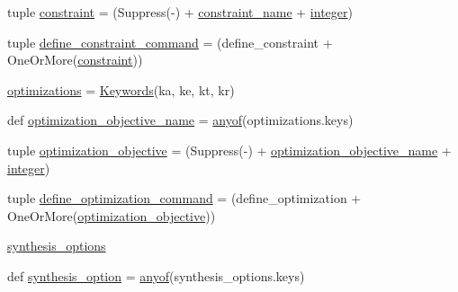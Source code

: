 \begin{DoxyCompactItemize}
\item 
tuple \hyperlink{namespacesylva_1_1misc_1_1tcl__parser_aca4985821c9124374a17c708bfcf6277}{constraint} = (Suppress(\textquotesingle{}-\/\textquotesingle{}) + \hyperlink{namespacesylva_1_1misc_1_1tcl__parser_a0e59a913865b08b792584c609dd496c1}{constraint\+\_\+name} + \hyperlink{namespacesylva_1_1misc_1_1tcl__parser_aaa6da6af48cbfc02e2f6edd078ea16ab}{integer})
\item 
tuple \hyperlink{namespacesylva_1_1misc_1_1tcl__parser_a6e28133e31ff032306235b32b0022359}{define\+\_\+constraint\+\_\+command} = (define\+\_\+constraint + One\+Or\+More(\hyperlink{namespacesylva_1_1misc_1_1tcl__parser_aca4985821c9124374a17c708bfcf6277}{constraint}))
\item 
\hyperlink{namespacesylva_1_1misc_1_1tcl__parser_a5a907b434f34bc173db7218151b9f179}{optimizations} = \hyperlink{classsylva_1_1misc_1_1tcl__parser_1_1_keywords}{Keywords}(\textquotesingle{}ka\textquotesingle{}, \textquotesingle{}ke\textquotesingle{}, \textquotesingle{}kt\textquotesingle{}, \textquotesingle{}kr\textquotesingle{})
\item 
def \hyperlink{namespacesylva_1_1misc_1_1tcl__parser_a077caeaf6529efc598181a9e58e12010}{optimization\+\_\+objective\+\_\+name} = \hyperlink{namespacesylva_1_1misc_1_1tcl__parser_abc9d84dd4132e13b642242dfac628084}{anyof}(optimizations.\+keys)
\item 
tuple \hyperlink{namespacesylva_1_1misc_1_1tcl__parser_a2824099d1a0d1a85a6148e0b5fdc31e8}{optimization\+\_\+objective} = (Suppress(\textquotesingle{}-\/\textquotesingle{}) + \hyperlink{namespacesylva_1_1misc_1_1tcl__parser_a077caeaf6529efc598181a9e58e12010}{optimization\+\_\+objective\+\_\+name} + \hyperlink{namespacesylva_1_1misc_1_1tcl__parser_aaa6da6af48cbfc02e2f6edd078ea16ab}{integer})
\item 
tuple \hyperlink{namespacesylva_1_1misc_1_1tcl__parser_a7d18cc1131533a809b16ee58f156c982}{define\+\_\+optimization\+\_\+command} = (define\+\_\+optimization + One\+Or\+More(\hyperlink{namespacesylva_1_1misc_1_1tcl__parser_a2824099d1a0d1a85a6148e0b5fdc31e8}{optimization\+\_\+objective}))
\item 
\hyperlink{namespacesylva_1_1misc_1_1tcl__parser_a733683e83c5d1482a9f247fd092c1e74}{synthesis\+\_\+options}
\item 
def \hyperlink{namespacesylva_1_1misc_1_1tcl__parser_ad0697a68890de131865fe7aa8519784e}{synthesis\+\_\+option} = \hyperlink{namespacesylva_1_1misc_1_1tcl__parser_abc9d84dd4132e13b642242dfac628084}{anyof}(synthesis\+\_\+options.\+keys)
\item 

\end{DoxyCompactItemize}

